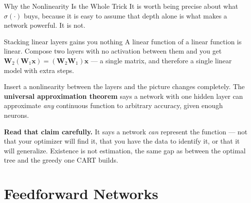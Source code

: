 \documentclass[aspectratio=169, 11pt]{beamer}
\begin{document}
\begin{frame}{Why the Nonlinearity Is the Whole Trick}
  It is worth being precise about what $\sigma(\cdot)$ buys, because it is easy to assume that
  depth alone is what makes a network powerful. It is not.

  \begin{definitionbox}{Stacking linear layers gains you nothing}
    A linear function of a linear function is linear. Compose two layers with no activation
    between them and you get $\mathbf{W}_2(\mathbf{W}_1\mathbf{x}) = (\mathbf{W}_2\mathbf{W}_1)\mathbf{x}$
    --- a single matrix, and therefore a single linear model with extra steps.
  \end{definitionbox}

  \vspace{0.1cm}
  Insert a nonlinearity between the layers and the picture changes completely. The
  \textbf{universal approximation theorem} says a network with one hidden layer can approximate
  \emph{any} continuous function to arbitrary accuracy, given enough neurons.

  \vspace{0.1cm}
  \textbf{Read that claim carefully.} It says a network \emph{can} represent the function --- not
  that your optimizer will find it, that you have the data to identify it, or that it will
  generalize. Existence is not estimation, the same gap as between the optimal tree and the
  greedy one CART builds.
\end{frame}

\section{Feedforward Networks}

\end{document}
